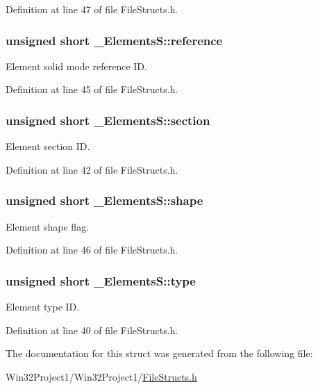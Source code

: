 Definition at line 47 of file File\+Structs.\+h.

\subsubsection[{\texorpdfstring{reference}{reference}}]{\setlength{\rightskip}{0pt plus 5cm}unsigned short \+\_\+\+Elements\+S\+::reference}\hypertarget{struct___elements_s_af9fa947d626f4bcdcb030fe4fab611c4}{}\label{struct___elements_s_af9fa947d626f4bcdcb030fe4fab611c4}


Element solid mode reference ID. 



Definition at line 45 of file File\+Structs.\+h.

\subsubsection[{\texorpdfstring{section}{section}}]{\setlength{\rightskip}{0pt plus 5cm}unsigned short \+\_\+\+Elements\+S\+::section}\hypertarget{struct___elements_s_a76160d7f046c6435586e878eb1ec93b4}{}\label{struct___elements_s_a76160d7f046c6435586e878eb1ec93b4}


Element section ID. 



Definition at line 42 of file File\+Structs.\+h.

\subsubsection[{\texorpdfstring{shape}{shape}}]{\setlength{\rightskip}{0pt plus 5cm}unsigned short \+\_\+\+Elements\+S\+::shape}\hypertarget{struct___elements_s_aff93e58a2996c7dcae7441a7d6804da0}{}\label{struct___elements_s_aff93e58a2996c7dcae7441a7d6804da0}


Element shape flag. 



Definition at line 46 of file File\+Structs.\+h.

\subsubsection[{\texorpdfstring{type}{type}}]{\setlength{\rightskip}{0pt plus 5cm}unsigned short \+\_\+\+Elements\+S\+::type}\hypertarget{struct___elements_s_ac4a61d8b7016a4a60a6e9f9b90904a93}{}\label{struct___elements_s_ac4a61d8b7016a4a60a6e9f9b90904a93}


Element type ID. 



Definition at line 40 of file File\+Structs.\+h.



The documentation for this struct was generated from the following file\+:\begin{DoxyCompactItemize}
\item 
Win32\+Project1/\+Win32\+Project1/\hyperlink{_file_structs_8h}{File\+Structs.\+h}\end{DoxyCompactItemize}
